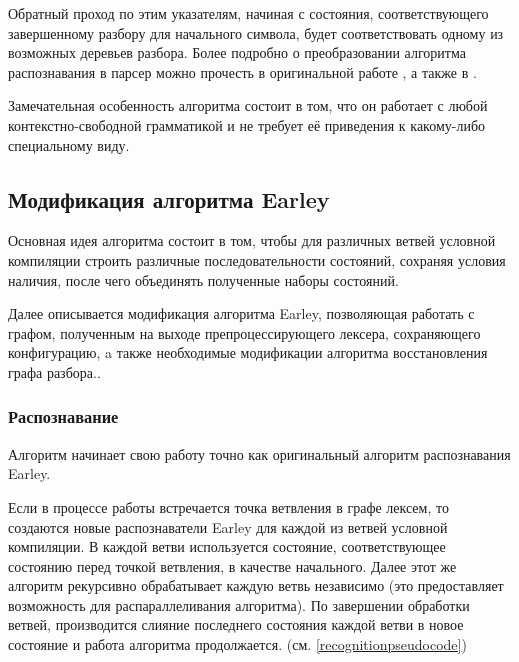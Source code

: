 Обратный проход по этим указателям, начиная с состояния, соответствующего завершенному разбору для начального символа, будет соответствовать одному из возможных деревьев разбора. Более подробно о преобразовании алгоритма распознавания в парсер можно прочесть в оригинальной работе \cite{earley68}, а также в \cite{recognizertoparser}.

Замечательная особенность алгоритма состоит в том, что он работает с любой контекстно-свободной грамматикой и не требует её приведения к какому-либо специальному виду.

\subsection{Модификация алгоритма Earley}
\label{subsec:earleymodification}

Основная идея алгоритма состоит в том, чтобы для различных ветвей условной компиляции строить различные последовательности состояний, сохраняя условия наличия, после чего объединять полученные наборы состояний.

Далее описывается модификация алгоритма Earley, позволяющая работать с графом, полученным на выходе препроцессирующего лексера, сохраняющего конфигурацию, a также необходимые модификации алгоритма восстановления графа разбора.. 

\subsubsection{Распознавание}

Алгоритм начинает свою работу точно как оригинальный алгоритм распознавания Earley.

Если в процессе работы встречается точка ветвления в графе лексем, то создаются новые распознаватели Earley для каждой из ветвей условной компиляции. В каждой ветви используется состояние, соответствующее состоянию перед точкой ветвления, в качестве начального. Далее этот же алгоритм рекурсивно обрабатывает каждую ветвь независимо (это предоставляет возможность для распараллеливания алгоритма). По завершении обработки ветвей, производится слияние последнего состояния каждой ветви в новое состояние и работа алгоритма продолжается. (см. \autoref{recognitionpseudocode})


